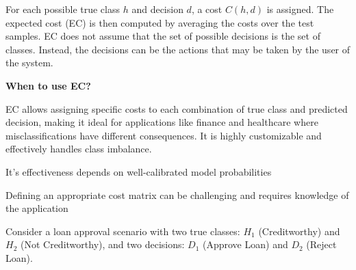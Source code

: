 \begin{center}
\end{center}

For each possible true class $h$ and decision $d$, a cost $C(h, d)$ is assigned. The expected cost (EC) is then computed by averaging the costs over the test samples. EC does not assume that the set of possible decisions is the set of classes. Instead, the decisions can be the actions that may be taken by the user of the system.


\textbf{When to use EC?}

EC allows assigning specific costs to each combination of true class and predicted decision, making it ideal for applications like finance and healthcare where misclassifications have different consequences. It is highly customizable and effectively handles class imbalance.

{
\item It's effectiveness depends on well-calibrated model probabilities 
\item Defining an appropriate cost matrix can be challenging and requires knowledge of the application 
}


\clearpage
\thispagestyle{classificationstyle}

Consider a loan approval scenario with two true classes: $H_1$ (Creditworthy) and $H_2$ (Not Creditworthy), and two decisions: $D_1$ (Approve Loan) and $D_2$ (Reject Loan).

